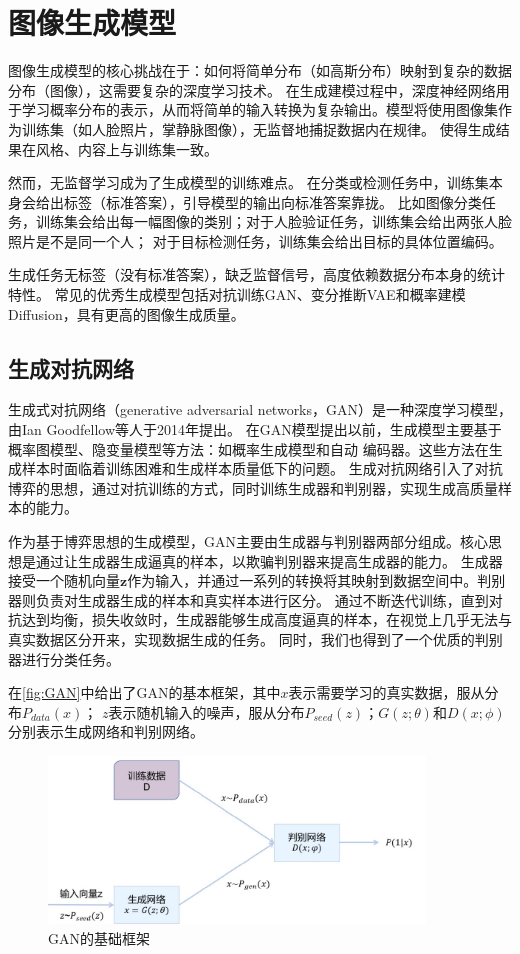 \chapter{图像生成模型}
\label{cha:sysu-thesis-contents-format-requirement}
图像生成模型的核心挑战在于：如何将简单分布（如高斯分布）映射到复杂的数据分布（图像），这需要复杂的深度学习技术。
在生成建模过程中，深度神经网络用于学习概率分布的表示，从而将简单的输入转换为复杂输出。模型将使用图像集作为训练集（如人脸照片，掌静脉图像），无监督地捕捉数据内在规律。
使得生成结果在风格、内容上与训练集一致。

然而，无监督学习成为了生成模型的训练难点。
在分类或检测任务中，训练集本身会给出标签（标准答案），引导模型的输出向标准答案靠拢。
比如图像分类任务，训练集会给出每一幅图像的类别；对于人脸验证任务，训练集会给出两张人脸照片是不是同一个人；
对于目标检测任务，训练集会给出目标的具体位置编码。

生成任务无标签（没有标准答案），缺乏监督信号，高度依赖数据分布本身的统计特性。
常见的优秀生成模型包括对抗训练GAN、变分推断VAE和概率建模Diffusion，具有更高的图像生成质量。

\section{生成对抗网络}
生成式对抗网络（generative adversarial networks，GAN）是一种深度学习模型，由Ian Goodfellow等人于2014年提出\cite{goodfellow2014generative}。
在GAN模型提出以前，生成模型主要基于概率图模型、隐变量模型等方法：如概率生成模型和自动
编码器。这些方法在生成样本时面临着训练困难和生成样本质量低下的问题。
生成对抗网络引入了对抗博弈的思想，通过对抗训练的方式，同时训练生成器和判别器，实现生成高质量样本的能力。

作为基于博弈思想的生成模型，GAN主要由生成器与判别器两部分组成。核心思想是通过让生成器生成逼真的样本，以欺骗判别器来提高生成器的能力。
生成器接受一个随机向量$\mathbf{z}$作为输入，并通过一系列的转换将其映射到数据空间中。判别器则负责对生成器生成的样本和真实样本进行区分。
通过不断迭代训练，直到对抗达到均衡，损失收敛时，生成器能够生成高度逼真的样本，在视觉上几乎无法与真实数据区分开来，实现数据生成的任务。
同时，我们也得到了一个优质的判别器进行分类任务。

在\autoref{fig:GAN}中给出了GAN的基本框架，其中$x$表示需要学习的真实数据，服从分布$P_{data}(x)$；
$z$表示随机输入的噪声，服从分布$P_{seed}(z)$；$G(z;\theta)$和$D(x;\phi)$分别表示生成网络和判别网络。
\begin{figure}[!htbp]
    \centering
    \includegraphics[width=10cm]{image/chap02/GAN.jpg}
    \caption{GAN的基础框架}
    \label{fig:GAN}
\end{figure}

